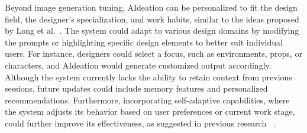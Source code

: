 Beyond image generation tuning, AIdeation can be personalized to fit the design field, the designer's specialization, and work habits, similar to the ideas proposed by Long et al.~\cite{long2024not}. The system could adapt to various design domains by modifying the prompts or highlighting specific design elements to better suit individual users. For instance, designers could select a focus, such as environments, props, or characters, and AIdeation would generate customized output accordingly. Although the system currently lacks the ability to retain context from previous sessions, future updates could include memory features and personalized recommendations. Furthermore, incorporating self-adaptive capabilities, where the system adjusts its behavior based on user preferences or current work stage, could further improve its effectiveness, as suggested in previous research ~\cite{macias2013self}.






